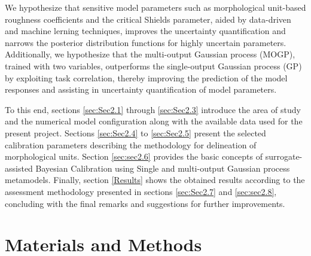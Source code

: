 \documentclass[draft,linenumbers,onecolumn]{agujournal2019} %
\begin{document}
We hypothesize that sensitive model parameters such as morphological unit-based roughness coefficients and the critical Shields parameter, aided by data-driven and machine lerning techniques, improves the uncertainty quantification and narrows the posterior distribution functions for highly uncertain parameters. Additionally, we hypothesize that the multi-output Gaussian process (MOGP), trained with two variables, outperforms the single-output Gaussian process (GP) by exploiting task correlation, thereby improving the prediction of the model responses and assisting in uncertainty quantification of model parameters.

 
To this end, sections  \ref{sec:Sec2.1} through \ref{sec:Sec2.3} introduce the area of study and the numerical model configuration along with the available data used for the present project. Sections \ref{sec:Sec2.4} to \ref{sec:Sec2.5} present the selected calibration parameters describing the methodology for delineation of morphological units. Section \ref{sec:sec2.6} provides the basic concepts of surrogate-assisted Bayesian Calibration using Single and multi-output Gaussian process metamodels. Finally, section \ref{Results} shows the obtained results according to the assessment methodology presented in sections \ref{sec:Sec2.7} and \ref{sec:sec2.8}, concluding with the final remarks and suggestions for further improvements.


\section{Materials and Methods} 
\label{Materials}
\end{document}
